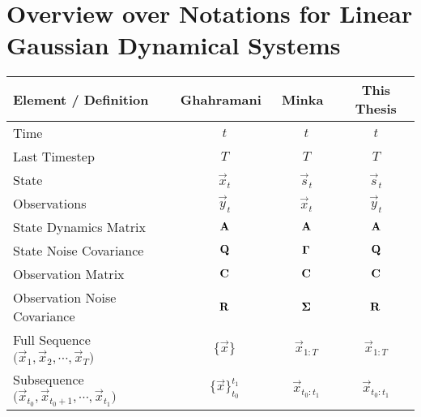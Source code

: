 	\section{Overview over Notations for Linear Gaussian Dynamical Systems}
		\begin{table}[ht]
			\centering
			\begin{tabular}{l|ccc}
				\textbf{Element / Definition} & \textbf{Ghahramani}~\cite{ghahramaniParameterEstimationLinear1996} & \textbf{Minka}~\cite{minkaHiddenMarkovModels1999} & \textbf{This Thesis} \\ \hline
				Time                         & \( t \)                         & \( t \)                 & \( t \)                                                    \\
				Last Timestep                & \( T \)                         & \( T \)                 & \( T \)                                                    \\
				State                        & \( \vec{x}_t \)                 & \( \vec{s}_t \)         & \( \vec{s}_t \)                                            \\
				Observations                 & \( \vec{y}_t \)                 & \( \vec{x}_t \)         & \( \vec{y}_t \)                                            \\
				State Dynamics Matrix        & \( \boldsymbol{\mathrm{A}} \)                   & \( \boldsymbol{\mathrm{A}} \)           & \( \boldsymbol{\mathrm{A}} \)                                              \\
				State Noise Covariance       & \( \boldsymbol{\mathrm{Q}} \)                   & \( \boldsymbol{\mathrm{\Gamma}} \)      & \( \boldsymbol{\mathrm{Q}} \)                                              \\
				Observation Matrix           & \( \boldsymbol{\mathrm{C}} \)                   & \( \boldsymbol{\mathrm{C}} \)           & \( \boldsymbol{\mathrm{C}} \)                                              \\
				Observation Noise Covariance & \( \boldsymbol{\mathrm{R}} \)                   & \( \boldsymbol{\mathrm{\Sigma}} \)      & \( \boldsymbol{\mathrm{R}} \)                                              \\
				Full Sequence \( \big( \vec{x}_1, \vec{x}_2, \cdots, \vec{x}_T \big) \)
				                             & \( \{ \vec{x} \} \)             & \( \vec{x}_{1:T} \)     & \( \vec{x}_{1:T} \)                                        \\
				Subsequence \( \big( \vec{x}_{t_0}, \vec{x}_{t_0 + 1}, \cdots, \vec{x}_{t_1} \big) \)
				                             & \( \{ \vec{x} \}_{t_0}^{t_1} \) & \( \vec{x}_{t_0:t_1} \) & \( \vec{x}_{t_0:t_1} \)                                    \\

\end{tabular}
\end{table}
